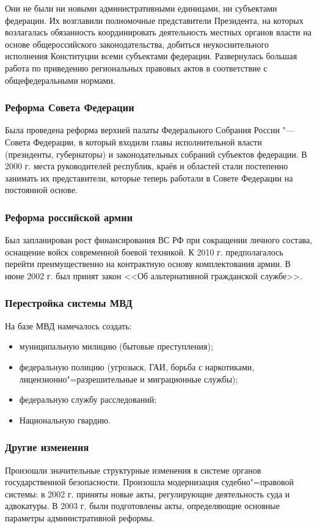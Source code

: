 Они не были ни новыми административными единицами, ни субъектами федерации. Их возглавили полномочные представители Президента, на которых возлагалась обязанность координировать деятельность местных органов власти на основе общероссийского законодательства, добиться неукоснительного исполнения Конституции всеми субъектами федерации. Развернулась большая работа по приведению региональных правовых актов в соответствие с общефедеральными нормами.

\subsubsection{Реформа Совета Федерации}
Была проведена реформа верхней палаты Федерального Собрания России "--- Совета Федерации, в который входили главы исполнительной власти (президенты, губернаторы) и законодательных собраний субъектов федерации. В 2000 г. места руководителей республик, краёв и областей стали постепенно занимать их представители, которые теперь работали в Совете Федерации на постоянной основе.

\subsubsection{Реформа российской армии}
Был запланирован рост финансирования ВС РФ при сокращении личного состава, оснащение войск современной боевой техникой. К 2010 г. предполагалось перейти преимущественно на контрактную основу комплектования армии. В июне 2002 г. был принят закон <<Об альтернативной гражданской службе>>.

\subsubsection{Перестройка системы МВД}
На базе МВД намечалось создать:

\begin{itemize}
\item муниципальную милицию (бытовые преступления);
\item федеральную полицию (угрозыск, ГАИ, борьба с наркотиками, лицензионно"=разрешительные и миграционные службы);
\item федеральную службу расследований;
\item Национальную гвардию.
\end{itemize}

\subsubsection{Другие изменения}
Произошли значительные структурные изменения в системе органов государственной безопасности. Произошла модернизация судебно"=правовой системы: в 2002 г. приняты новые акты, регулирующие деятельность суда и адвокатуры. В 2003 г. были подготовлены акты, определяющие основные параметры административной реформы.

